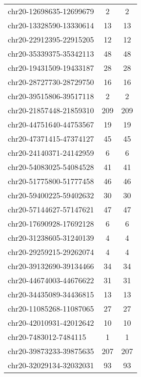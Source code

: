 \documentclass[10pt,letterpaper]{article}
\begin{document}
{\begin{longtable}{lSS}
	chr20-12698635-12699679 & 2      & 2                     \\
	chr20-13328590-13330614 & 13     & 13                    \\
	chr20-22912395-22915205 & 12     & 12                    \\
	chr20-35339375-35342113 & 48     & 48                    \\
	chr20-19431509-19433187 & 28     & 28                    \\
	chr20-28727730-28729750 & 16     & 16                    \\
	chr20-39515806-39517118 & 2      & 2                     \\
	chr20-21857448-21859310 & 209    & 209                   \\
	chr20-44751640-44753567 & 19     & 19                    \\
	chr20-47371415-47374127 & 45     & 45                    \\
	chr20-24140371-24142959 & 6      & 6                     \\
	chr20-54083025-54084528 & 41     & 41                    \\
	chr20-51775800-51777458 & 46     & 46                    \\
	chr20-59400225-59402632 & 30     & 30                    \\
	chr20-57144627-57147621 & 47     & 47                    \\
	chr20-17690928-17692128 & 6      & 6                     \\
	chr20-31238605-31240139 & 4      & 4                     \\
	chr20-29259215-29262074 & 4      & 4                     \\
	chr20-39132690-39134466 & 34     & 34                    \\
	chr20-44674003-44676622 & 31     & 31                    \\
	chr20-34435089-34436815 & 13     & 13                    \\
	chr20-11085268-11087065 & 27     & 27                    \\
	chr20-42010931-42012642 & 10     & 10                    \\
	chr20-7483012-7484115   & 1      & 1                     \\
	chr20-39873233-39875635 & 207    & 207                   \\
	chr20-32029134-32032031 & 93     & 93                    \\

\end{longtable}}
\end{document}
